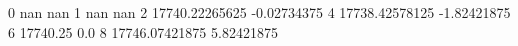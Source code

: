 0 nan nan
1 nan nan
2 17740.22265625 -0.02734375
4 17738.42578125 -1.82421875
6 17740.25 0.0
8 17746.07421875 5.82421875
